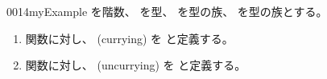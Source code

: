 \documentclass[index]{subfiles}
\begin{document}
\begin{myBlock}{0014}{myExample}
  を階数、
  を型、
  を型の族、
  を型の族とする。
  \begin{enumerate}
  \item 関数に対し、
    (currying)
    を
    と定義する。
  \item 関数に対し、
    (uncurrying)
    を
    と定義する。
  \end{enumerate}
\end{myBlock}
\end{document}

